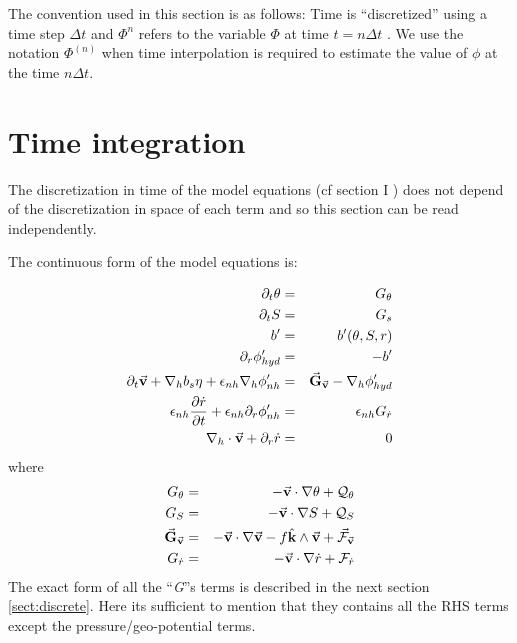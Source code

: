 
The convention used in this section is as follows:
Time is ``discretized'' using a time step $\Delta t$   
and $\Phi^n$ refers to the variable $\Phi$ 
at time $t = n \Delta t$ . We use the notation $\Phi^{(n)}$
when time interpolation is required to estimate the value of $\phi$
at the time $n \Delta t$.

\section{Time integration}

The discretization in time of the model equations (cf section I )
does not depend of the discretization in space of each
term and so  this section can be read independently.
 
The continuous form of the model equations is:

\begin{eqnarray}
\partial_t \theta & = & G_\theta
\label{eq-tCsC-theta}
\\
\partial_t S & = & G_s
\label{eq-tCsC-salt}
\\
b' & = & b'(\theta,S,r)
\\
\partial_r \phi'_{hyd} & = & -b'
\label{eq-tCsC-hyd}
\\
\partial_t \vec{\bf v}
+ {\bf \nabla}_h b_s \eta
+ \epsilon_{nh} {\bf \nabla}_h \phi'_{nh}
& = & \vec{\bf G}_{\vec{\bf v}} 
- {\bf \nabla}_h \phi'_{hyd}
\label{eq-tCsC-Hmom}
\\
\epsilon_{nh} \frac {\partial{\dot{r}}}{\partial{t}}
+ \epsilon_{nh} \partial_r \phi'_{nh}
& = & \epsilon_{nh} G_{\dot{r}} 
\label{eq-tCsC-Vmom}
\\
{\bf \nabla}_h \cdot \vec{\bf v} + \partial_r \dot{r}
& = & 0
\label{eq-tCsC-cont}
\end{eqnarray}
where
\begin{eqnarray*}
G_\theta & = &
- \vec{\bf v} \cdot {\bf \nabla} \theta + {\cal Q}_\theta
\\
G_S & = &
- \vec{\bf v} \cdot {\bf \nabla} S + {\cal Q}_S
\\
\vec{\bf G}_{\vec{\bf v}}
& = &
- \vec{\bf v} \cdot {\bf \nabla} \vec{\bf v}
- f \hat{\bf k} \wedge \vec{\bf v}
+ \vec{\cal F}_{\vec{\bf v}}
\\
G_{\dot{r}}
& = &
- \vec{\bf v} \cdot {\bf \nabla} \dot{r}
+ {\cal F}_{\dot{r}}
\end{eqnarray*}
The exact form of all the ``{\it G}''s terms is described in the next
section \ref{sect:discrete}. Here its sufficient to mention that they contains
all the RHS terms except the pressure/geo-potential terms.


